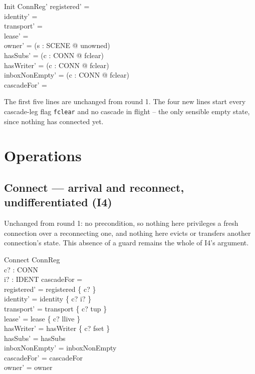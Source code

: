 \documentclass[a4paper,10pt,fleqn]{article}
\begin{document}
\begin{schema}{Init}
  ConnReg'
\where
  registered' = \emptyset \\
  identity' = \emptyset \\
  transport' = \emptyset \\
  lease' = \emptyset \\
  owner' = (\lambda s : SCENE @ unowned) \\
  hasSubs' = (\lambda c : CONN @ fclear) \\
  hasWriter' = (\lambda c : CONN @ fclear) \\
  inboxNonEmpty' = (\lambda c : CONN @ fclear) \\
  cascadeFor' = \emptyset
\end{schema}

The first five lines are unchanged from round 1. The four new lines start
every cascade-leg flag \texttt{fclear} and no cascade in flight -- the only
sensible empty state, since nothing has connected yet.

\section{Operations}

\subsection{Connect --- arrival and reconnect, undifferentiated (I4)}

Unchanged from round 1: no precondition, so nothing here privileges a
fresh connection over a reconnecting one, and nothing here evicts or
transfers another connection's state. This absence of a guard remains the
whole of I4's argument.

\begin{schema}{Connect}
  \Delta ConnReg \\
  c? : CONN \\
  i? : IDENT
\where
  cascadeFor = \emptyset \\
  registered' = registered \cup \{ c? \} \\
  identity' = identity \oplus \{ c? \mapsto i? \} \\
  transport' = transport \oplus \{ c? \mapsto tup \} \\
  lease' = lease \oplus \{ c? \mapsto llive \} \\
  hasWriter' = hasWriter \oplus \{ c? \mapsto fset \} \\
  hasSubs' = hasSubs \\
  inboxNonEmpty' = inboxNonEmpty \\
  cascadeFor' = cascadeFor \\
  owner' = owner
\end{schema}
\end{document}
